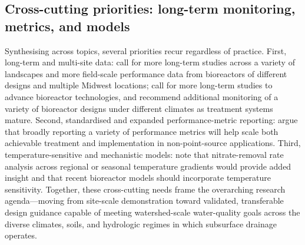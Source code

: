 \subsection{Cross-cutting priorities: long-term monitoring, metrics, and models}
Synthesising across topics, several priorities recur regardless of practice. First, long-term and multi-site data: \textcite{Bell2015} call for more long-term studies across a variety of landscapes and more field-scale performance data from bioreactors of different designs and multiple Midwest locations; \textcite{Christianson2021} call for more long-term studies to advance bioreactor technologies, and \textcite{Bailon2025} recommend additional monitoring of a variety of bioreactor designs under different climates as treatment systems mature. Second, standardised and expanded performance-metric reporting: \textcite{Maxwell2022} argue that broadly reporting a variety of performance metrics will help scale both achievable treatment and implementation in non-point-source applications. Third, temperature-sensitive and mechanistic models: \textcite{Christianson2021} note that nitrate-removal rate analysis across regional or seasonal temperature gradients would provide added insight and that recent bioreactor models should incorporate temperature sensitivity. Together, these cross-cutting needs frame the overarching research agenda---moving from site-scale demonstration toward validated, transferable design guidance capable of meeting watershed-scale water-quality goals across the diverse climates, soils, and hydrologic regimes in which subsurface drainage operates.